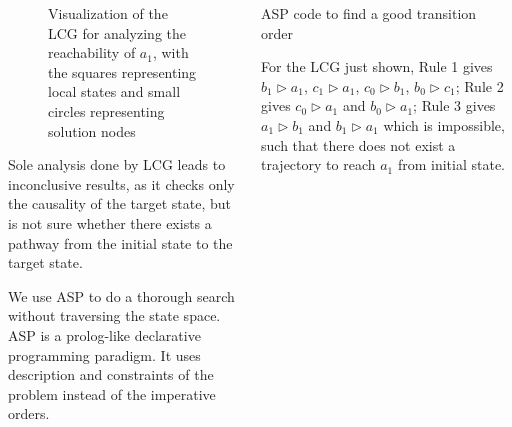\documentclass[final]{beamer}
\begin{document}
\begin{frame}[t]{}
\begin{columns}[t]
\begin{column}{.45\linewidth}
\begin{figure}
    \centering
    
    \caption{Visualization of the LCG for analyzing the reachability of $a_1$, with the squares representing local states and small circles representing solution nodes}
\end{figure}
Sole analysis done by LCG leads to inconclusive results, as it checks only the causality of the target state, but is not sure whether there exists a pathway from the initial state to the target state.

We use ASP to do a thorough search without traversing the state space. 
ASP is a prolog-like declarative programming paradigm.
It uses description and constraints of the problem instead of the imperative orders.
\end{column}

\begin{column}{.50\linewidth}


\begin{block}{ASP code to find a good transition order}

\end{block}

\usebox{\myLst} %

For the LCG just shown, Rule 1 gives $b_1\rhd a_1$, $c_1\rhd a_1$, $c_0\rhd b_1$, $b_0\rhd c_1$; Rule 2 gives $c_0\rhd a_1$ and $b_0\rhd a_1$; Rule 3 gives $a_1\rhd b_1$ and $b_1\rhd a_1$ which is impossible, such that there does not exist a trajectory to reach $a_1$ from initial state.


\end{column}
\end{columns}
\end{frame}
\end{document}
